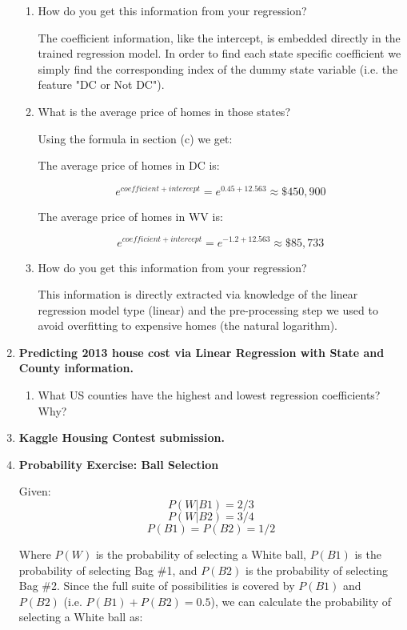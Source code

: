 \documentclass[12pt]{article}
\begin{document}
\begin{enumerate}[leftmargin=\labelsep]
\begin{enumerate}[label=(\alph*)]
  \item How do you get this information from your regression?

    The coefficient information, like the intercept, is embedded directly in the trained regression model. In order to find each state specific coefficient we simply find the corresponding index of the dummy state variable (i.e. the feature "DC or Not DC").

  \item What is the average price of homes in those states?

    Using the formula in section (c) we get:

    The average price of homes in DC is:

      \[ e^{coefficient + intercept} = e^{0.45 + 12.563} \approx \$450,900 \]

    The average price of homes in WV is:

      \[ e^{coefficient + intercept} = e^{-1.2 + 12.563} \approx \$85,733 \]

  \item How do you get this information from your regression?

    This information is directly extracted via knowledge of the linear regression model type (linear) and the pre-processing step we used to avoid overfitting to expensive homes (the natural logarithm).

  \end{enumerate}

\item \textbf{Predicting 2013 house cost via Linear Regression with State and County information.}

  \begin{enumerate}[label=(\alph*)]
  \item What US counties have the highest and lowest regression coefficients? Why?
  \end{enumerate}

\item \textbf{Kaggle Housing Contest submission.}
\item \textbf{Probability Exercise: Ball Selection}

  Given:
    \[ P(W | B1) = 2/3 \]
    \[ P(W | B2) = 3/4 \]
    \[ P(B1) = P(B2) = 1/2 \]

  Where \(P(W)\) is the probability of selecting a White ball, \(P(B1)\) is the probability of selecting Bag \#1, and \(P(B2)\) is the probability of selecting Bag \#2.
  Since the full suite of possibilities is covered by \(P(B1)\) and \(P(B2)\) (i.e. \( P(B1) + P(B2) = 0.5 \)), we can calculate the probability of selecting a White ball as:


\end{enumerate}
\end{document}
